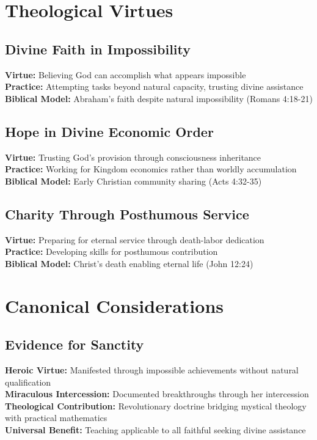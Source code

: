 \documentclass[12pt,a4paper]{article}
\begin{document}
\section{Theological Virtues}

\subsection{Divine Faith in Impossibility}

\textbf{Virtue:} Believing God can accomplish what appears impossible\\
\textbf{Practice:} Attempting tasks beyond natural capacity, trusting divine assistance\\
\textbf{Biblical Model:} Abraham's faith despite natural impossibility (Romans 4:18-21)

\subsection{Hope in Divine Economic Order}

\textbf{Virtue:} Trusting God's provision through consciousness inheritance\\
\textbf{Practice:} Working for Kingdom economics rather than worldly accumulation\\
\textbf{Biblical Model:} Early Christian community sharing (Acts 4:32-35)

\subsection{Charity Through Posthumous Service}

\textbf{Virtue:} Preparing for eternal service through death-labor dedication\\
\textbf{Practice:} Developing skills for posthumous contribution\\
\textbf{Biblical Model:} Christ's death enabling eternal life (John 12:24)

\section{Canonical Considerations}

\subsection{Evidence for Sanctity}

\textbf{Heroic Virtue:} Manifested through impossible achievements without natural qualification\\
\textbf{Miraculous Intercession:} Documented breakthroughs through her intercession\\
\textbf{Theological Contribution:} Revolutionary doctrine bridging mystical theology with practical mathematics\\
\textbf{Universal Benefit:} Teaching applicable to all faithful seeking divine assistance
\end{document}
